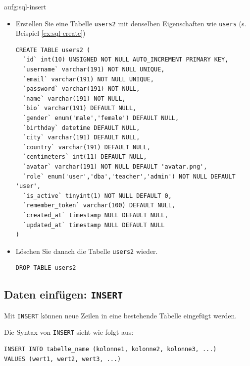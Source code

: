 \begin{aufgabe}{aufg:sql-insert}
\begin{itemize}
\item Erstellen Sie eine Tabelle \texttt{users2} mit denselben Eigenschaften wie \texttt{users} (s. Beispiel \ref{ex:sql-create})
\begin{myantwort}
\begin{lstlisting}[style=sql]
CREATE TABLE users2 (
  `id` int(10) UNSIGNED NOT NULL AUTO_INCREMENT PRIMARY KEY,
  `username` varchar(191) NOT NULL UNIQUE,
  `email` varchar(191) NOT NULL UNIQUE,
  `password` varchar(191) NOT NULL,
  `name` varchar(191) NOT NULL,
  `bio` varchar(191) DEFAULT NULL,
  `gender` enum('male','female') DEFAULT NULL,
  `birthday` datetime DEFAULT NULL,
  `city` varchar(191) DEFAULT NULL,
  `country` varchar(191) DEFAULT NULL,
  `centimeters` int(11) DEFAULT NULL,
  `avatar` varchar(191) NOT NULL DEFAULT 'avatar.png',
  `role` enum('user','dba','teacher','admin') NOT NULL DEFAULT 'user',
  `is_active` tinyint(1) NOT NULL DEFAULT 0,
  `remember_token` varchar(100) DEFAULT NULL,
  `created_at` timestamp NULL DEFAULT NULL,
  `updated_at` timestamp NULL DEFAULT NULL
)
\end{lstlisting}
\end{myantwort}
\item Löschen Sie danach die Tabelle \texttt{users2} wieder.
\begin{myantwort}
\begin{lstlisting}[style=sql]
DROP TABLE users2
\end{lstlisting}
\end{myantwort}
\end{itemize}
\end{aufgabe}


\subsection{Daten einfügen: \lstinline[style=sql]|INSERT|}

Mit \lstinline[style=sql]|INSERT| können neue Zeilen in eine bestehende Tabelle eingefügt werden.

Die Syntax von \lstinline[style=sql]|INSERT| sieht wie folgt aus:

\begin{lstlisting}[style=sql]
INSERT INTO tabelle_name (kolonne1, kolonne2, kolonne3, ...)
VALUES (wert1, wert2, wert3, ...)
\end{lstlisting}

